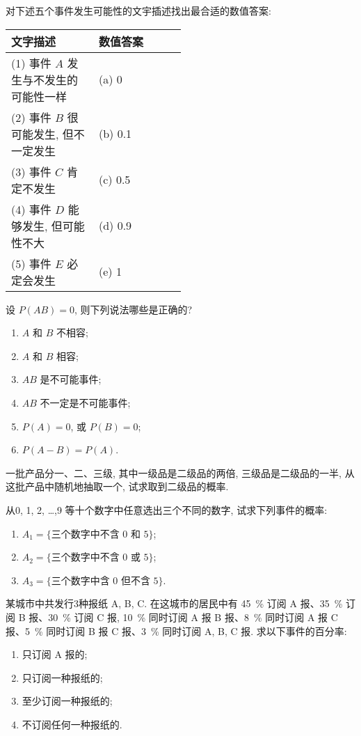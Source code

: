 \begin{xiti}
  \item 对下述五个事件发生可能性的文宇插述找出最合适的数值答案:\\
  \begin{tabularx}{0.7\linewidth}{p{0.5\linewidth}l}
    \toprule
    文字描述 & 数值答案\\
    \midrule
    (1) 事件 $A$ 发生与不发生的可能性一样 & (a) 0\\
    (2) 事件 $B$ 很可能发生, 但不一定发生 & (b) 0.1\\
    (3) 事件 $C$ 肯定不发生 & (c) 0.5\\
    (4) 事件 $D$ 能够发生, 但可能性不大 & (d) 0.9\\
    (5) 事件 $E$ 必定会发生 & (e) 1\\
    \bottomrule
  \end{tabularx}

  \item 设 $P (AB) = 0$,
  则下列说法哪些是正确的?
  \begin{enumerate}
    \item $A$ 和 $B$ 不相容;
    \item $A$ 和 $B$ 相容;
    \item $AB$ 是不可能事件;
    \item $AB$ 不一定是不可能事件;
    \item $P(A) = 0$, 或 $P(B) = 0$;
    \item $P(A-B) = P(A)$.
  \end{enumerate}

  \item 一批产品分一、二、三级,
  其中一级品是二级品的两倍,
  三级品是二级品的一半,
  从这批产品中随机地抽取一个,
  试求取到二级品的概率.

  \item 从0, 1, 2, \dots,9 等十个数字中任意选出三个不同的数字,
  试求下列事件的概率:
  \begin{enumerate}
    \item $A_1 = \{ \text{三个数字中不含 0 和 5} \}$;
    \item $A_2 = \{ \text{三个数字中不含 0 或 5} \}$;
    \item $A_3 = \{ \text{三个数字中含 0 但不含 5} \}$.
  \end{enumerate}

  \item 某城市中共发行3种报纸 A, B, C.
  在这城市的居民中有 \SI{45}{\percent} 订阅 A 报、\SI{35}{\percent} 订阅 B 报、\SI{30}{\percent} 订阅 C 报,
  \SI{10}{\percent} 同时订阅 A 报 B 报、\SI{8}{\percent} 同时订阅 A 报 C 报、\SI{5}{\percent} 同时订阅 B 报 C 报、\SI{3}{\percent} 同时订阅 A, B, C 报.
  求以下事件的百分率:
  \begin{enumerate}
    \item 只订阅 A 报的;
    \item 只订阅一种报纸的;
    \item 至少订阅一种报纸的;
    \item 不订阅任何一种报纸的.
  \end{enumerate}


\end{xiti}
